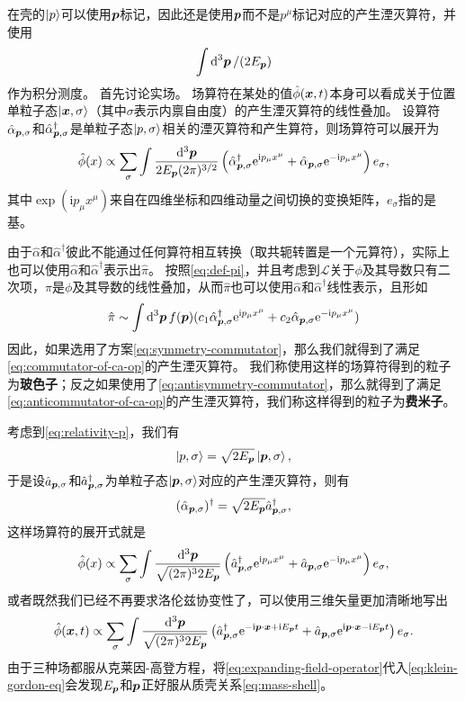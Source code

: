 \documentclass[hyperref, UTF8, a4paper]{ctexart}
\newcommand*{\ii}{\mathrm{i}}
\newcommand*{\ee}{\mathrm{e}}
\begin{document}
在壳的$\ket{p}$可以使用$\vb*{p}$标记，因此还是使用$\vb*{p}$而不是$p^\mu$标记对应的产生湮灭算符，并使用
\[
    \int \dd[3]{\vb*{p}} / (2 E_{\vb*{p}})
\]
作为积分测度。
首先讨论实场。
场算符在某处的值$\hat{\phi}(\vb*{x}, t)$本身可以看成关于位置单粒子态$\ket{\vb*{x}, \sigma}$（其中$\sigma$表示内禀自由度）的产生湮灭算符的线性叠加。
设算符$\hat{\alpha}_{\vb*{p}, \sigma}$和$\hat{\alpha}^\dagger_{\vb*{p}, \sigma}$是单粒子态$\ket{p, \sigma}$相关的湮灭算符和产生算符，则场算符可以展开为
\begin{equation}
    \hat{\phi} (x) \propto \sum_\sigma \int \frac{\dd[3]{\vb*{p}}}{2 E_{\vb*{p}} (2\pi)^{3/2} } \left( \hat{\alpha}^\dagger_{\vb*{p}, \sigma} \ee^{\ii p_\mu x^\mu} + \hat{\alpha}_{\vb*{p}, \sigma} \ee^{- \ii p_\mu x^\mu} \right) e_\sigma,
    \label{eq:expanding-field-operator-relativity}
\end{equation}
其中$\exp(\ii p_\mu x^\mu)$来自在四维坐标和四维动量之间切换的变换矩阵，$e_\sigma$指的是基。

由于$\hat{\alpha}$和$\hat{\alpha}^\dagger$彼此不能通过任何算符相互转换（取共轭转置是一个元算符），实际上也可以使用$\hat{\alpha}$和$\hat{\alpha}^\dagger$表示出$\hat{\pi}$。
按照\eqref{eq:def-pi}，并且考虑到$\mathcal{L}$关于$\phi$及其导数只有二次项，$\pi$是$\phi$及其导数的线性叠加，从而$\hat{\pi}$也可以使用$\hat{\alpha}$和$\hat{\alpha}^\dagger$线性表示，且形如
\[
    \hat{\pi} \sim \int \dd[3]{\vb*{p}} f(\vb*{p}) (c_1 \hat{\alpha}^\dagger_{\vb*{p}, \sigma} \ee^{\ii p_\mu x^\mu} + c_2 \hat{\alpha}_{\vb*{p}, \sigma} \ee^{- \ii p_\mu x^\mu})
\]
因此，如果选用了方案\eqref{eq:symmetry-commutator}，那么我们就得到了满足\eqref{eq:commutator-of-ca-op}的产生湮灭算符。
我们称使用这样的场算符得到的粒子为\textbf{玻色子}；反之如果使用了\eqref{eq:antisymmetry-commutator}，那么就得到了满足\eqref{eq:anticommutator-of-ca-op}的产生湮灭算符，我们称这样得到的粒子为\textbf{费米子}。

考虑到\eqref{eq:relativity-p}，我们有
\[
    \ket{p, \sigma} = \sqrt{2 E_{\vb*{p}}} \ket{\vb*{p}, \sigma},
\]
于是设$\hat{a}_{\vb*{p}, \sigma}$和$\hat{a}^\dagger_{\vb*{p}, \sigma}$为单粒子态$\ket{\vb*{p}, \sigma}$对应的产生湮灭算符，则有
\[
    (\hat{\alpha}_{\vb*{p}, \sigma})^\dagger = \sqrt{2E_{\vb*{p}}} \hat{a}_{\vb*{p}, \sigma}^\dagger,
\]
这样场算符的展开式就是
\[
    \hat{\phi}(x) \propto \sum_\sigma \int \frac{\dd[3]{\vb*{p}}}{\sqrt{(2\pi)^3 2 E_{\vb*{p}}}} \left( \hat{a}^\dagger_{\vb*{p}, \sigma} \ee^{\ii p_\mu x^\mu} + \hat{a}_{\vb*{p}, \sigma} \ee^{- \ii p_\mu x^\mu} \right) e_\sigma,
\]
或者既然我们已经不再要求洛伦兹协变性了，可以使用三维矢量更加清晰地写出
\begin{equation}
    \hat{\phi}(\vb*{x}, t) \propto \sum_\sigma \int \frac{\dd[3]{\vb*{p}}}{\sqrt{(2\pi)^3 2 E_{\vb*{p}}}} \left( \hat{a}^\dagger_{\vb*{p}, \sigma} \ee^{- \ii \vb*{p} \cdot \vb*{x} + \ii E_{\vb*{p}} t} + \hat{a}_{\vb*{p}, \sigma} \ee^{\ii \vb*{p} \cdot \vb*{x} - \ii E_{\vb*{p}} t} \right) e_\sigma. 
    \label{eq:expanding-field-operator}
\end{equation}
由于三种场都服从克莱因-高登方程，将\eqref{eq:expanding-field-operator}代入\eqref{eq:klein-gordon-eq}会发现$E_{\vb*{p}}$和$\vb*{p}$正好服从质壳关系\eqref{eq:mass-shell}。
\end{document}
